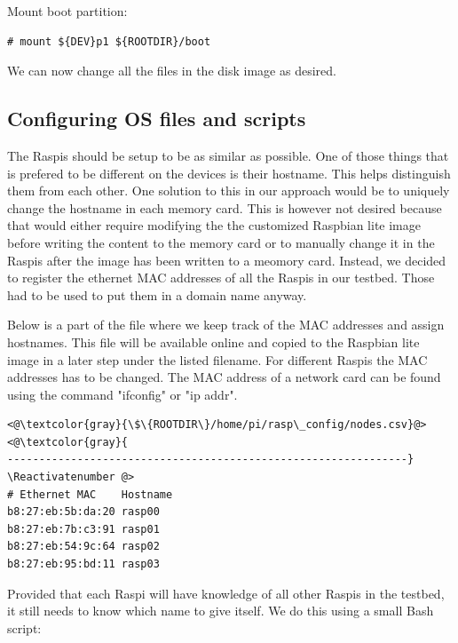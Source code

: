 Mount boot partition:
\begin{lstlisting}[]
# mount ${DEV}p1 ${ROOTDIR}/boot
\end{lstlisting}
\FloatBarrier
\vspace{-5mm}

We can now change all the files in the disk image as desired.



\subsection{Configuring OS files and scripts}

The \ac{Raspi}s should be setup to be as similar as possible. One of those
things that is prefered to be different on the devices is their hostname.
This helps distinguish them from each other. One solution to this in our
approach would be to uniquely change the hostname in each memory card.
This is however not desired because that would either require modifying
the the customized Raspbian lite image before writing the content to the
memory card or to manually change it in the \ac{Raspi}s after the image has
been written to a meomory card.
Instead, we decided to register the ethernet MAC addresses of all the \ac{Raspi}s
in our testbed. Those had to be used to put them in a domain name anyway.

Below is a part of the file where we keep track of the MAC addresses and assign
hostnames. This file will be available online and copied to the Raspbian lite
image in a later step under the listed filename. For different \ac{Raspi}s
the MAC addresses has to be changed. The MAC address of a network card can be found
using the command "ifconfig" or "ip addr".

\Suppressnumber\begin{lstlisting}[]
<@\textcolor{gray}{\$\{ROOTDIR\}/home/pi/rasp\_config/nodes.csv}@>
<@\textcolor{gray}{
---------------------------------------------------------------}
\Reactivatenumber @>
# Ethernet MAC    Hostname
b8:27:eb:5b:da:20 rasp00
b8:27:eb:7b:c3:91 rasp01
b8:27:eb:54:9c:64 rasp02
b8:27:eb:95:bd:11 rasp03
\end{lstlisting}
\FloatBarrier
\vspace{-5mm}

Provided that each \ac{Raspi} will have knowledge of all other \ac{Raspi}s in
the testbed, it still needs to know which name to give itself.
We do this using a small Bash script:

